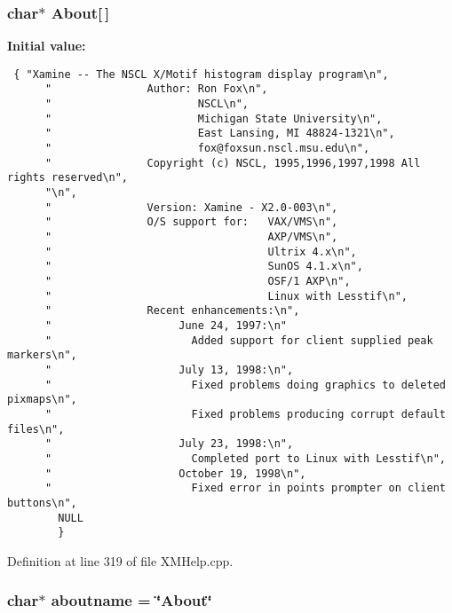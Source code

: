 \subsubsection{\setlength{\rightskip}{0pt plus 5cm}char$\ast$ About[$\,$]\hspace{0.3cm}{\tt  [static]}}\label{XMHelp_8cpp_a2}


{\bf Initial value:}

\footnotesize\begin{verbatim} { "Xamine -- The NSCL X/Motif histogram display program\n",
      "               Author: Ron Fox\n",
      "                       NSCL\n",
      "                       Michigan State University\n",
      "                       East Lansing, MI 48824-1321\n",
      "                       fox@foxsun.nscl.msu.edu\n",
      "               Copyright (c) NSCL, 1995,1996,1997,1998 All rights reserved\n",
      "\n",
      "               Version: Xamine - X2.0-003\n",
      "               O/S support for:   VAX/VMS\n",
      "                                  AXP/VMS\n",
      "                                  Ultrix 4.x\n",
      "                                  SunOS 4.1.x\n",
      "                                  OSF/1 AXP\n",
      "                                  Linux with Lesstif\n",
      "               Recent enhancements:\n",
      "                    June 24, 1997:\n"
      "                      Added support for client supplied peak markers\n",
      "                    July 13, 1998:\n",
      "                      Fixed problems doing graphics to deleted pixmaps\n",
      "                      Fixed problems producing corrupt default files\n",
      "                    July 23, 1998:\n",
      "                      Completed port to Linux with Lesstif\n",
      "                    October 19, 1998\n",
      "                      Fixed error in points prompter on client buttons\n",
        NULL
        }\end{verbatim}\normalsize 


Definition at line 319 of file XMHelp.cpp.
\subsubsection{\setlength{\rightskip}{0pt plus 5cm}char$\ast$ aboutname = \char`\"{}{\bf About}\char`\"{}\hspace{0.3cm}{\tt  [static]}}\label{XMHelp_8cpp_a3}




